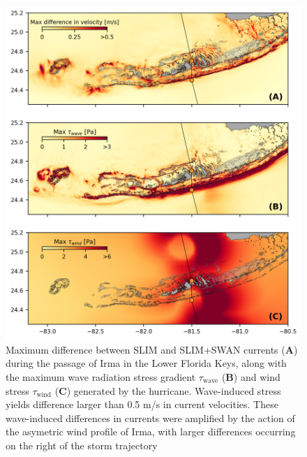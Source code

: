 \documentclass[11pt,a4paper]{article}
\begin{document}
\begin{figure}
    \centering
    \includegraphics[width=\textwidth]{fig/max_diff_reefs.png}
    \caption{Maximum difference between SLIM and SLIM+SWAN currents (\textbf{A}) during the passage of Irma in the Lower Florida Keys, along with the maximum wave radiation stress gradient {\boldmath$\tau$}$_\text{wave}$ (\textbf{B}) and wind stress {\boldmath$\tau$}$_\text{wind}$ (\textbf{C}) generated by the hurricane. Wave-induced stress yields difference larger than 0.5 m/s in current velocities. These wave-induced differences in currents were amplified by the action of the asymetric wind profile of Irma, with larger differences occurring on the right of the storm trajectory}
    \label{fig:diff}
\end{figure}
\end{document}
